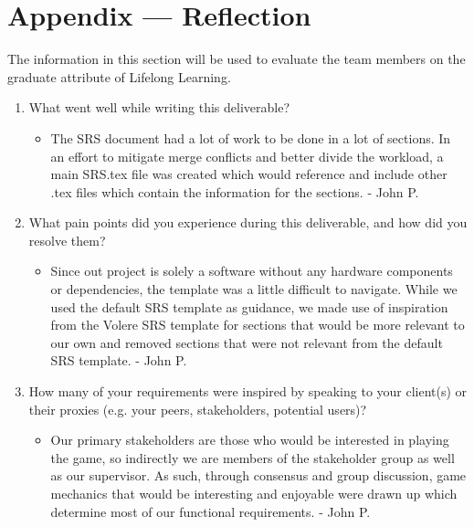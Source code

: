 \section*{Appendix --- Reflection}


The information in this section will be used to evaluate the team members on the
graduate attribute of Lifelong Learning.  

%

\begin{enumerate}
  \item What went well while writing this deliverable?
  
	\begin{itemize}
		\item The SRS document had a lot of work to be done in a lot of sections. In an effort to mitigate merge conflicts and better divide the workload, a main SRS.tex file was created which would reference and include other .tex files which contain the information for the sections. - John P.
	\end{itemize}  
  
  \item What pain points did you experience during this deliverable, and how did
  you resolve them?
  
	\begin{itemize}
		\item Since out project is solely a software without any hardware components or dependencies, the template was a little difficult to navigate. While we used the default SRS template as guidance, we made use of inspiration from the Volere SRS template for sections that would be more relevant to our own and removed sections that were not relevant from the default SRS template. - John P.
	\end{itemize}    
  
  \item How many of your requirements were inspired by speaking to your
  client(s) or their proxies (e.g. your peers, stakeholders, potential users)?
  
	\begin{itemize}
		\item Our primary stakeholders are those who would be interested in playing the game, so indirectly we are members of the stakeholder group as well as our supervisor. As such, through consensus and group discussion, game mechanics that would be interesting and enjoyable were drawn up which determine most of our functional requirements. - John P.
	\end{itemize}    
  

\end{enumerate}
